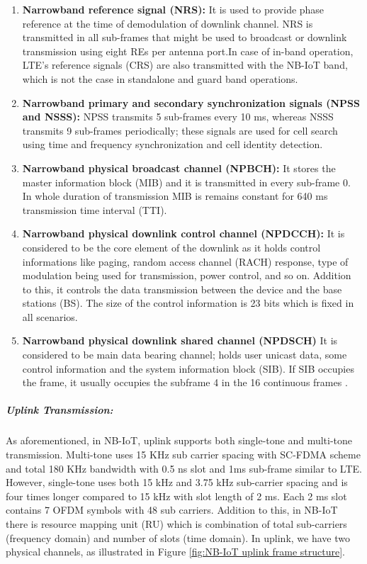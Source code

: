 \documentclass[12pt]{article}
\begin{document}
\begin{enumerate}

    \item \textbf {Narrowband reference signal (NRS):}
    It is used to provide phase reference at the time of demodulation of downlink channel. NRS is transmitted in all sub-frames that might be used to broadcast or downlink transmission using eight REs per antenna port.In case of in-band operation, LTE's reference signals (CRS) are also transmitted with the NB-IoT band, which is not the case in standalone and guard band operations.

    \item \textbf{ Narrowband primary and secondary synchronization signals (NPSS and NSSS):}
    NPSS transmits 5 sub-frames every 10 ms, whereas NSSS transmits 9 sub-frames periodically; these signals are used for cell search using time and frequency synchronization and cell identity detection.
    
    \item \textbf{Narrowband physical broadcast channel (NPBCH):} It stores the master information block (MIB) and it is transmitted in every sub-frame 0. In whole duration of transmission MIB is remains constant for 640 ms transmission time interval (TTI).
    
    \item \textbf{Narrowband physical downlink control channel (NPDCCH):} It is considered to be the core element of the downlink as it holds control informations like paging, random access channel (RACH) response, type of modulation being used for transmission, power control, and so on. Addition to this, it controls the data transmission between the device and the base stations (BS). The size of the control information is 23 bits which is fixed in all scenarios.
    
    \item \textbf{Narrowband physical downlink shared channel (NPDSCH)} It is considered to be main data bearing channel; holds user unicast data, some control information and the system information block (SIB). If SIB occupies the frame, it usually occupies the subframe 4 in the 16 continuous frames \cite{malik2018radio}.
 \end{enumerate}

 \subparagraph{Uplink Transmission:} As aforementioned, in NB-IoT, uplink supports both single-tone and multi-tone transmission. Multi-tone uses 15 KHz sub carrier spacing with SC-FDMA scheme and total 180 KHz bandwidth with 0.5 ns slot and 1ms sub-frame similar to LTE. However, single-tone uses both 15 kHz and 3.75 kHz sub-carrier spacing and is four times longer compared to 15 kHz with slot length of 2 ms. Each 2 ms slot contains 7 OFDM symbols with 48 sub carriers. Addition to this, in NB-IoT there is resource mapping unit (RU) which is combination of total sub-carriers (frequency domain) and number of slots (time domain). In uplink, we have two physical channels, as illustrated in Figure \ref{fig:NB-IoT uplink frame structure}.
 
\end{document}
